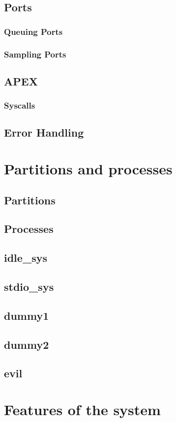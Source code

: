 \subsection{Ports}

\subsubsection{Queuing Ports}
\subsubsection{Sampling Ports}


\subsection{APEX}

\subsubsection{Syscalls}


\subsection{Error Handling}


\section{Partitions and processes}

\subsection{Partitions}

\subsection{Processes}

\subsection{idle\_sys}

\subsection{stdio\_sys}

\subsection{dummy1}

\subsection{dummy2}

\subsection{evil}


\section{Features of the system}
